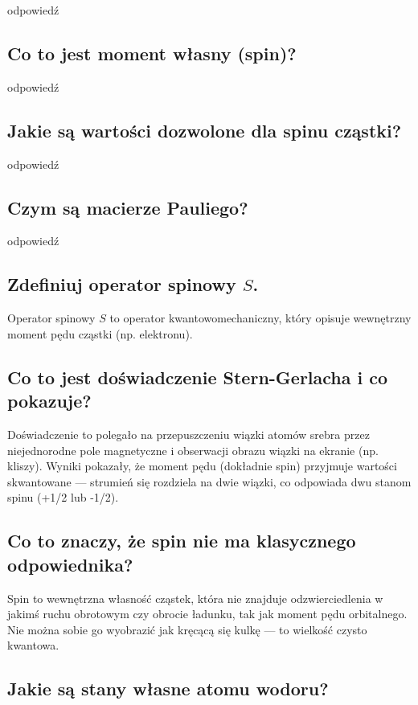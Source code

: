 odpowiedź

\subsection{Co to jest moment własny (spin)?}

odpowiedź

\subsection{Jakie są wartości dozwolone dla spinu cząstki?}

odpowiedź

\subsection{Czym są macierze Pauliego?}

odpowiedź

\subsection{Zdefiniuj operator spinowy $S$.}

Operator spinowy $S$ to operator kwantowomechaniczny, który opisuje wewnętrzny moment pędu cząstki (np. elektronu).


\subsection{Co to jest doświadczenie Stern-Gerlacha i co pokazuje?}

Doświadczenie to polegało na przepuszczeniu wiązki atomów srebra przez niejednorodne pole magnetyczne i obserwacji obrazu wiązki na ekranie (np. kliszy). Wyniki pokazały, że moment pędu (dokładnie spin) przyjmuje wartości skwantowane — strumień się rozdziela na dwie wiązki, co odpowiada dwu stanom spinu (+1/2 lub -1/2).

\subsection{Co to znaczy, że spin nie ma klasycznego odpowiednika?}

Spin to wewnętrzna własność cząstek, która nie znajduje odzwierciedlenia w jakimś ruchu obrotowym czy obrocie ładunku, tak jak moment pędu orbitalnego. Nie można sobie go wyobrazić jak kręcącą się kulkę — to wielkość czysto kwantowa.

\subsection{Jakie są stany własne atomu wodoru?}

